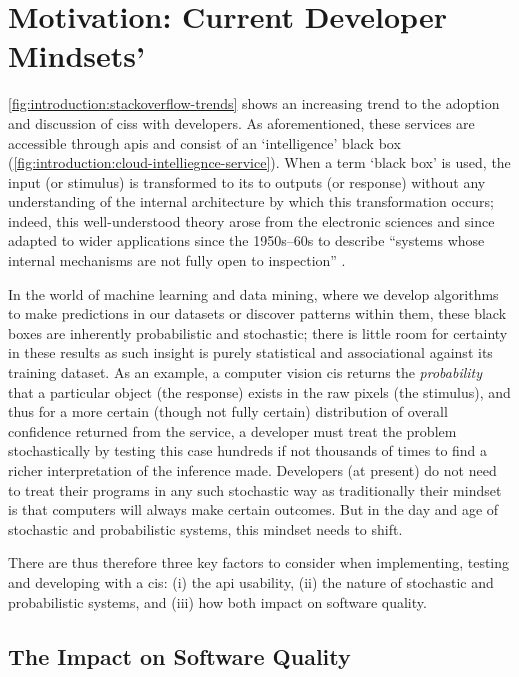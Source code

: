 \section{Motivation: Current Developer Mindsets'}
\label{sec:introduction:motivation}

\cref{fig:introduction:stackoverflow-trends} shows an increasing trend to the adoption and discussion of \glspl{cis} with developers. As aforementioned, these services are accessible through \glspl{api} and consist of an `intelligence' black box (\cref{fig:introduction:cloud-intelliegnce-service}). When a term `black box' is used, the input (or stimulus) is transformed to its to outputs (or response) without any understanding of the internal architecture by which this transformation occurs; indeed, this well-understood theory arose from the electronic sciences and since adapted to wider applications since the 1950s--60s \citep{Ashby:1957db,Bunge:1963jm} to describe ``systems whose internal mechanisms are not fully open to inspection'' \citep{Ashby:1957db}. 

In the world of machine learning and data mining, where we develop algorithms to make predictions in our datasets or discover patterns within them, these black boxes are inherently probabilistic and stochastic; there is little room for certainty in these results as such insight is purely statistical and associational \citep{Pearl:2018uv} against its training dataset. As an example, a computer vision \gls{cis} returns the \textit{probability} that a particular object (the response) exists in the raw pixels (the stimulus), and thus for a more certain (though not fully certain) distribution of overall confidence returned from the service, a developer must treat the problem stochastically by testing this case hundreds if not thousands of times to find a richer interpretation of the inference made. Developers (at present) do not need to treat their programs in any such stochastic way as traditionally their mindset is that computers will always make certain outcomes. But in the day and age of stochastic and probabilistic systems, this mindset needs to shift.

There are thus therefore three key factors to consider when implementing, testing and developing with a \gls{cis}: (i) the \gls{api} usability, (ii) the nature of stochastic and probabilistic systems, and (iii) how both impact on software quality.

\subsection{The Impact on Software Quality}
\label{ssec:introduction:motivation:impact}


